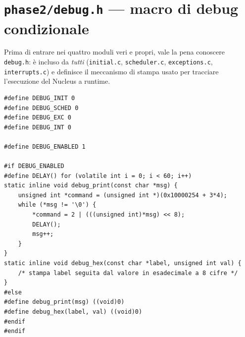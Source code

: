 \documentclass[11pt,a4paper]{article}
\newcommand{\code}[1]{\texttt{#1}}
\begin{document}
\section{\code{phase2/debug.h} --- macro di debug condizionale}

Prima di entrare nei quattro moduli veri e propri, vale la pena conoscere
\code{debug.h}: è incluso da \emph{tutti} (\code{initial.c},
\code{scheduler.c}, \code{exceptions.c}, \code{interrupts.c}) e definisce
il meccanismo di stampa usato per tracciare l'esecuzione del Nucleus a
runtime.

\begin{lstlisting}
#define DEBUG_INIT 0
#define DEBUG_SCHED 0
#define DEBUG_EXC 0
#define DEBUG_INT 0

#define DEBUG_ENABLED 1

#if DEBUG_ENABLED
#define DELAY() for (volatile int i = 0; i < 60; i++)
static inline void debug_print(const char *msg) {
    unsigned int *command = (unsigned int *)(0x10000254 + 3*4);
    while (*msg != '\0') {
        *command = 2 | (((unsigned int)*msg) << 8);
        DELAY();
        msg++;
    }
}
static inline void debug_hex(const char *label, unsigned int val) {
    /* stampa label seguita dal valore in esadecimale a 8 cifre */
}
#else
#define debug_print(msg) ((void)0)
#define debug_hex(label, val) ((void)0)
#endif
#endif
\end{lstlisting}
\end{document}
